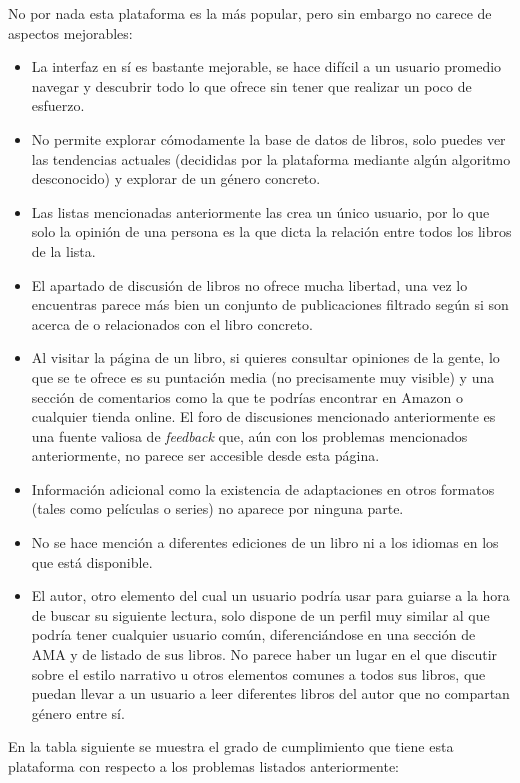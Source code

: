 No por nada esta plataforma es la más popular, pero sin embargo no carece de aspectos mejorables:

\begin{itemize}
    \item La interfaz en sí es bastante mejorable, se hace difícil a un usuario promedio navegar y descubrir todo lo que ofrece sin tener que realizar un poco de esfuerzo.
    \item No permite explorar cómodamente la base de datos de libros, solo puedes ver las tendencias actuales (decididas por la plataforma mediante algún algoritmo desconocido) y explorar de un género concreto.
    \item Las listas mencionadas anteriormente las crea un único usuario, por lo que solo la opinión de una persona es la que dicta la relación entre todos los libros de la lista.
    \item El apartado de discusión de libros no ofrece mucha libertad, una vez lo encuentras parece más bien un conjunto de publicaciones filtrado según si son acerca de o relacionados con el libro concreto.
    \item Al visitar la página de un libro, si quieres consultar opiniones de la gente, lo que se te ofrece es su puntación media (no precisamente muy visible) y una sección de comentarios como la que te podrías encontrar en Amazon o cualquier tienda online. El foro de discusiones mencionado anteriormente es una fuente valiosa de \textit{feedback} que, aún con los problemas mencionados anteriormente, no parece ser accesible desde esta página.
    \item Información adicional como la existencia de adaptaciones en otros formatos (tales como películas o series) no aparece por ninguna parte.
    \item No se hace mención a diferentes ediciones de un libro ni a los idiomas en los que está disponible.
    \item El autor, otro elemento del cual un usuario podría usar para guiarse a la hora de buscar su siguiente lectura, solo dispone de un perfil muy similar al que podría tener cualquier usuario común, diferenciándose en una sección de AMA y de listado de sus libros. No parece haber un lugar en el que discutir sobre el estilo narrativo u otros elementos comunes a todos sus libros, que puedan llevar a un usuario a leer diferentes libros del autor que no compartan género entre sí.
\end{itemize}

En la tabla siguiente se muestra el grado de cumplimiento que tiene esta plataforma con respecto a los problemas listados anteriormente:

